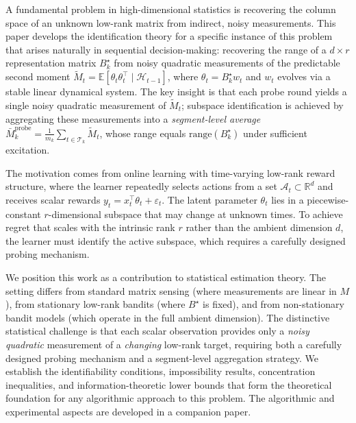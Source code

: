 \documentclass[12pt]{article}
\newcommand{\R}{\mathbb{R}}
\newcommand{\E}{\mathbb{E}}
\newcommand{\cA}{\mathcal{A}}
\newcommand{\cH}{\mathcal{H}}
\newcommand{\cT}{\mathcal{T}}
\newcommand{\range}{\mathrm{range}}
\theoremstyle{plain}
\theoremstyle{definition}
\begin{document}
A fundamental problem in high-dimensional statistics is recovering the column space of an unknown low-rank matrix from indirect, noisy measurements. This paper develops the identification theory for a specific instance of this problem that arises naturally in sequential decision-making: recovering the range of a $d \times r$ representation matrix $B_k^\star$ from noisy quadratic measurements of the predictable second moment $\widetilde{M}_t = \E[\theta_t \theta_t^\top \mid \cH_{t-1}]$, where $\theta_t = B_k^\star w_t$ and $w_t$ evolves via a stable linear dynamical system. The key insight is that each probe round yields a single noisy quadratic measurement of $\widetilde{M}_t$; subspace identification is achieved by aggregating these measurements into a \emph{segment-level average} $\bar{M}_k^{\mathrm{probe}} = \frac{1}{m_k}\sum_{t \in \cT_k} \widetilde{M}_t$, whose range equals $\range(B_k^\star)$ under sufficient excitation.

The motivation comes from online learning with time-varying low-rank reward structure, where the learner repeatedly selects actions from a set $\cA_t \subset \R^d$ and receives scalar rewards $y_t = x_t^\top \theta_t + \varepsilon_t$. The latent parameter $\theta_t$ lies in a piecewise-constant $r$-dimensional subspace that may change at unknown times. To achieve regret that scales with the intrinsic rank $r$ rather than the ambient dimension $d$, the learner must identify the active subspace, which requires a carefully designed probing mechanism.

We position this work as a contribution to statistical estimation theory. The setting differs from standard matrix sensing (where measurements are linear in $M$), from stationary low-rank bandits (where $B^\star$ is fixed), and from non-stationary bandit models (which operate in the full ambient dimension). The distinctive statistical challenge is that each scalar observation provides only a \emph{noisy quadratic} measurement of a \emph{changing} low-rank target, requiring both a carefully designed probing mechanism and a segment-level aggregation strategy. We establish the identifiability conditions, impossibility results, concentration inequalities, and information-theoretic lower bounds that form the theoretical foundation for any algorithmic approach to this problem. The algorithmic and experimental aspects are developed in a companion paper.
\end{document}
